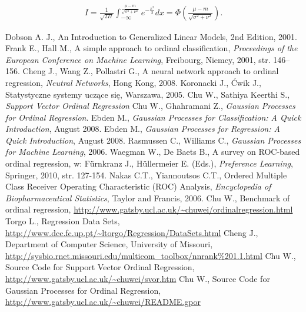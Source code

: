 \documentclass{mini}
\begin{document}
\begin{eqnarray*}
I = 
\frac{1}{\sqrt{2\Pi}}\int_{-\infty}^{\frac{\mu-m}{\sqrt{\sigma^2+\nu^2}}} e^{-\frac{x^2}{2}} dx = \Phi \left(   \frac{\mu-m}{\sqrt{\sigma^2+\nu^2}}  \right).
\end{eqnarray*}


\begin{thebibliography}{9}
	 Dobson A. J., An Introduction to Generalized Linear Models, 2nd Edition, 2001.
	 Frank E., Hall M., A simple approach to ordinal classification, \emph{Proceedings of the European Conference on Machine Learning}, Freibourg, Niemcy, 2001, str. 146--156.
	 Cheng J., Wang Z., Pollastri G., A neural network approach to ordinal regression, \emph{Neutral Networks}, Hong Kong, 2008.
	 Koronacki J., Ćwik J., Statystyczne systemy uczące się, Warszawa, 2005. 
	 Chu W., Sathiya Keerthi S., \emph{Support Vector Ordinal Regression}
	 Chu W., Ghahramani Z., \emph{Gaussian Processes for Ordinal Regression}.
	 Ebden M., \emph{Gaussian Processes for Classification: A Quick Introduction}, August 2008.
	 Ebden M., \emph{Gaussian Processes for Regression: A Quick Introduction}, August 2008.
	 Rasmussen C., Williams C., \emph{Gaussian Processes for Machine Learning}, 2006.
	 Waegman W., De Baets B., A survey on ROC-based ordinal regression, w: Fürnkranz J., Hüllermeier E. (Eds.), \emph{Preference Learning}, Springer, 2010, str. 127-154.
	 Nakas C.T., Yiannoutsos C.T., Ordered Multiple Class Receiver Operating Characteristic (ROC) Analysis, \emph{Encyclopedia of Biopharmaceutical Statistics}, Taylor and Francis, 2006.
	 Chu W., Benchmark of ordinal regression, \url{http://www.gatsby.ucl.ac.uk/~chuwei/ordinalregression.html}
	 Torgo L., Regression Data Sets, \url{http://www.dcc.fc.up.pt/~ltorgo/Regression/DataSets.html}
	 Cheng J., Department of Computer Science, University of Missouri, \url{http://sysbio.rnet.missouri.edu/multicom_toolbox/nnrank\%201.1.html}
	 Chu W., Source Code for Support Vector Ordinal Regression, \url{http://www.gatsby.ucl.ac.uk/~chuwei/svor.htm}
	 Chu W., Source Code for Gaussian Processes for Ordinal Regression, \url{http://www.gatsby.ucl.ac.uk/~chuwei/README.gpor}

	

	
\end{thebibliography}


\makestatement
\end{document}
